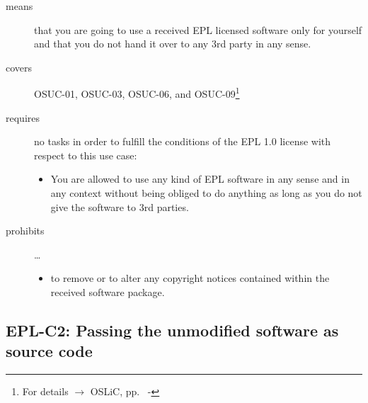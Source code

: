 \begin{description}

\item[means] that you are going to use a received EPL licensed software only
for yourself and that you do not hand it over to any 3rd party in any sense.

\item[covers] OSUC-01, OSUC-03, OSUC-06, and OSUC-09\footnote{For details 
$\rightarrow$ OSLiC, pp.\ \pageref{OSUC-01-DEF} - \pageref{OSUC-09-DEF}}

\item[requires] no tasks in order to fulfill the conditions of the EPL 1.0
license with respect to this use case:
  \begin{itemize}
    \item You are allowed to use any kind of EPL software in any sense and in
    any context without being obliged to do anything as long as you do not
    give the software to 3rd parties.
  \end{itemize}

\item[prohibits] \ldots
\begin{itemize}
  \item to remove or to alter any copyright notices contained within the
  received software package.
\end{itemize}

\end{description}

\subsection{EPL-C2: Passing the unmodified software as source code}
\label{OSUC-02S-EPL} \label{OSUC-05S-EPL} \label{OSUC-07S-EPL} 

